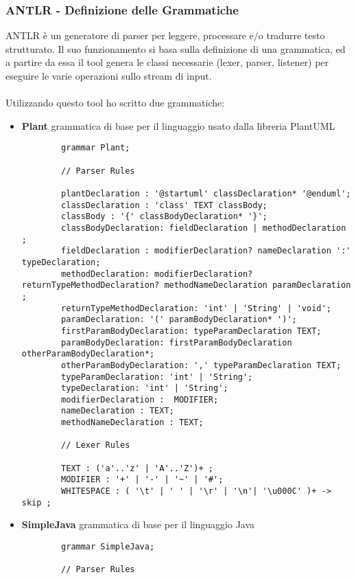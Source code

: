 \documentclass{article}
\begin{document}
  \subsubsection{ANTLR - Definizione delle Grammatiche}
  ANTLR è un generatore di parser per leggere, processare e/o tradurre testo strutturato. Il suo funzionamento si basa sulla definizione di una grammatica, ed a partire
  da essa il tool genera le classi necessarie (lexer, parser, listener) per eseguire le varie operazioni sullo stream di input.\\
  \\Utilizzando questo tool ho scritto due grammatiche:
  \begin{itemize}
    \item \textbf{Plant} grammatica di base per il linguaggio usato dalla libreria PlantUML
      \begin{lstlisting}
        grammar Plant;

        // Parser Rules

        plantDeclaration : '@startuml' classDeclaration* '@enduml';
        classDeclaration : 'class' TEXT classBody;
        classBody : '{' classBodyDeclaration* '}';
        classBodyDeclaration: fieldDeclaration | methodDeclaration ;
        fieldDeclaration : modifierDeclaration? nameDeclaration ':' typeDeclaration;
        methodDeclaration: modifierDeclaration? returnTypeMethodDeclaration? methodNameDeclaration paramDeclaration  ;
        returnTypeMethodDeclaration: 'int' | 'String' | 'void';
        paramDeclaration: '(' paramBodyDeclaration* ')';
        firstParamBodyDeclaration: typeParamDeclaration TEXT;
        paramBodyDeclaration: firstParamBodyDeclaration otherParamBodyDeclaration*;
        otherParamBodyDeclaration: ',' typeParamDeclaration TEXT;
        typeParamDeclaration: 'int' | 'String';
        typeDeclaration: 'int' | 'String';
        modifierDeclaration :  MODIFIER;
        nameDeclaration : TEXT;
        methodNameDeclaration : TEXT;

        // Lexer Rules

        TEXT : ('a'..'z' | 'A'..'Z')+ ;
        MODIFIER : '+' | '-' | '~' | '#';
        WHITESPACE : ( '\t' | ' ' | '\r' | '\n'| '\u000C' )+ -> skip ;
      \end{lstlisting}
    \item \textbf{SimpleJava} grammatica di base per il linguaggio Java
      \begin{lstlisting}
        grammar SimpleJava;

        // Parser Rules


\end{lstlisting}
\end{itemize}
\end{document}
